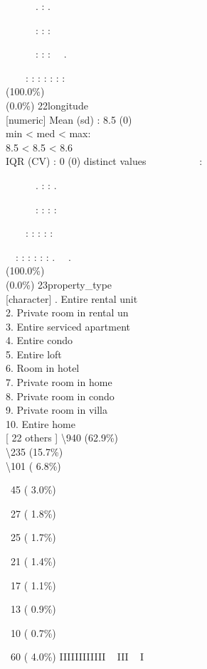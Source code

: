 \documentclass[
  journal,
]{IEEEtran}%
\begin{document}
\strut ~~~~~~. : .\\
\strut ~~~~~~: : :\\
\strut ~~~~~~: : : ~~.\\
\strut ~~~~: : : : : : : \\
(100.0\%) \\
(0.0\%) \textbar{} \textbar{} 22\textbar longitude\\
{[}numeric{]} \textbar Mean (sd) : 8.5 (0)\\
min \textless{} med \textless{} max:\\
8.5 \textless{} 8.5 \textless{} 8.6\\
IQR (CV) : 0 (0)  distinct values \textbar{}
\textbar~~~~~~~~~~:\\
\strut ~~~~~~. : : .\\
\strut ~~~~~~: : : :\\
\strut ~~~~: : : : :\\
\strut ~~: : : : : : . ~~. \\
(100.0\%) \\
(0.0\%) \textbar{} \textbar{} 23\textbar property\_type\\
{[}character{]} . Entire rental unit\\
2. Private room in rental un\\
3. Entire serviced apartment\\
4. Entire condo\\
5. Entire loft\\
6. Room in hotel\\
7. Private room in home\\
8. Private room in condo\\
9. Private room in villa\\
10. Entire home\\
{[} 22 others {]} \textbar\textbackslash940 (62.9\%)\\
\textbackslash235 (15.7\%)\\
\textbackslash101 ( 6.8\%)\\
\strut ~45 ( 3.0\%)\\
\strut ~27 ( 1.8\%)\\
\strut ~25 ( 1.7\%)\\
\strut ~21 ( 1.4\%)\\
\strut ~17 ( 1.1\%)\\
\strut ~13 ( 0.9\%)\\
\strut ~10 ( 0.7\%)\\
\strut ~60 ( 4.0\%) \textbar{} \textbar IIIIIIIIIIII ~ III ~ I ~ ~ ~ ~ ~
\end{document}
